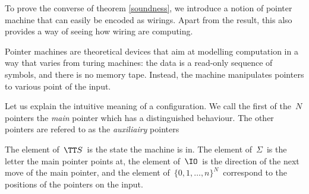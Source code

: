 To prove the converse of theorem \ref{soundness}, we introduce a notion of pointer machine that can easily be encoded as wirings. Apart from the result, this also provides a way of seeing how wiring are computing.

Pointer machines \cite{ben-amram_what_1995} are theoretical devices that aim at modelling computation in a way that varies from turing machines: the data is a read-only sequence of symbols, and there is no memory tape. Instead, the machine manipulates pointers to various point of the input.



Let us explain the intuitive meaning of a configuration. We call the first of the $\,N\,$ pointers the \emph{main} pointer which has a distinguished behaviour. The other pointers are refered to as the \emph{auxiliairy} pointers

The element of $\,\TT S\,$ is the state the machine is in. The element of $\,\Sigma\,$ is the letter the main pointer points at, the element of $\,\IO\,$ is the direction of the next move of the main pointer, and the element of $\,\{0,1,\dots,n\}^N\,$ correspond to the positions of the pointers on the input.

